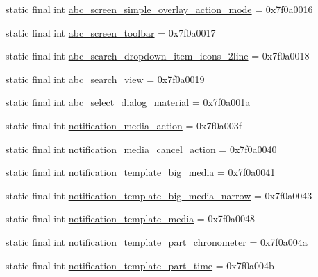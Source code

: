 \begin{DoxyCompactItemize}
\item 
static final int \mbox{\hyperlink{classcom_1_1google_1_1android_1_1gms_1_1R_1_1layout_a833ba531b95fda8cd556ee2172090d32}{abc\+\_\+screen\+\_\+simple\+\_\+overlay\+\_\+action\+\_\+mode}} = 0x7f0a0016
\item 
static final int \mbox{\hyperlink{classcom_1_1google_1_1android_1_1gms_1_1R_1_1layout_a3076d2f7c6e82e026167449f519a5118}{abc\+\_\+screen\+\_\+toolbar}} = 0x7f0a0017
\item 
static final int \mbox{\hyperlink{classcom_1_1google_1_1android_1_1gms_1_1R_1_1layout_a516927126d54f4b6b410e87c366ee558}{abc\+\_\+search\+\_\+dropdown\+\_\+item\+\_\+icons\+\_\+2line}} = 0x7f0a0018
\item 
static final int \mbox{\hyperlink{classcom_1_1google_1_1android_1_1gms_1_1R_1_1layout_a8eb704b42a10f6d555ba7b4a90242895}{abc\+\_\+search\+\_\+view}} = 0x7f0a0019
\item 
static final int \mbox{\hyperlink{classcom_1_1google_1_1android_1_1gms_1_1R_1_1layout_a825babde63375f9f0ddb4b454fde4ecd}{abc\+\_\+select\+\_\+dialog\+\_\+material}} = 0x7f0a001a
\item 
static final int \mbox{\hyperlink{classcom_1_1google_1_1android_1_1gms_1_1R_1_1layout_a273cf8374b6bbc95aa24c2db23ee2a08}{notification\+\_\+media\+\_\+action}} = 0x7f0a003f
\item 
static final int \mbox{\hyperlink{classcom_1_1google_1_1android_1_1gms_1_1R_1_1layout_a666709978cc88ba5985ae75440ff25be}{notification\+\_\+media\+\_\+cancel\+\_\+action}} = 0x7f0a0040
\item 
static final int \mbox{\hyperlink{classcom_1_1google_1_1android_1_1gms_1_1R_1_1layout_a37e993a690b438f60b00cc26b28a7f96}{notification\+\_\+template\+\_\+big\+\_\+media}} = 0x7f0a0041
\item 
static final int \mbox{\hyperlink{classcom_1_1google_1_1android_1_1gms_1_1R_1_1layout_a1b9ceb42e5c5e20ec630b01f7a59e76f}{notification\+\_\+template\+\_\+big\+\_\+media\+\_\+narrow}} = 0x7f0a0043
\item 
static final int \mbox{\hyperlink{classcom_1_1google_1_1android_1_1gms_1_1R_1_1layout_a74903946df0455617529204966e82cc2}{notification\+\_\+template\+\_\+media}} = 0x7f0a0048
\item 
static final int \mbox{\hyperlink{classcom_1_1google_1_1android_1_1gms_1_1R_1_1layout_ac80a7425f4b063df120036a2238dde17}{notification\+\_\+template\+\_\+part\+\_\+chronometer}} = 0x7f0a004a
\item 
static final int \mbox{\hyperlink{classcom_1_1google_1_1android_1_1gms_1_1R_1_1layout_ae43524517c555e7e00609df285daa8ee}{notification\+\_\+template\+\_\+part\+\_\+time}} = 0x7f0a004b

\end{DoxyCompactItemize}
